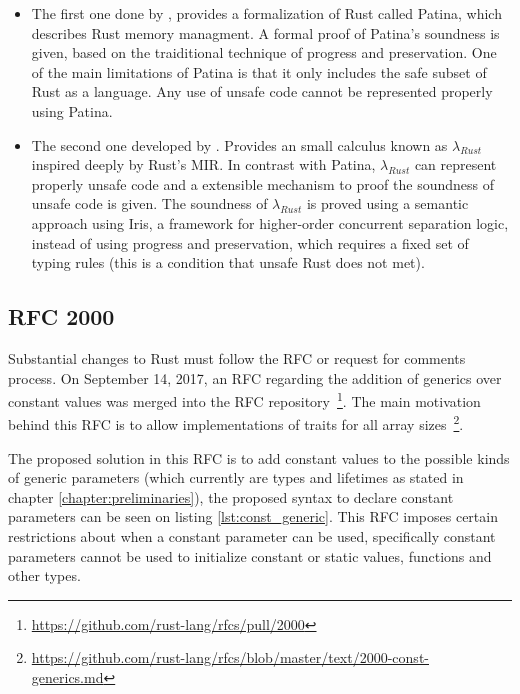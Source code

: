 \begin{itemize} 
    
    \item The first one done by \citet{reed}, provides a formalization of Rust
        called Patina, which describes Rust memory managment. A formal proof of
        Patina's soundness is given, based on the traiditional technique of
        progress and preservation. One of the main limitations of Patina is that
        it only includes the safe subset of Rust as a language. Any use of
        unsafe code cannot be represented properly using Patina.

    \item The second one developed by \citet{ralf}. Provides an small calculus
        known as $\lambda_{Rust}$ inspired deeply by Rust's MIR. In contrast
        with Patina, $\lambda_{Rust}$ can represent properly unsafe code and a
        extensible mechanism to proof the soundness of unsafe code is given. The
        soundness of $\lambda_{Rust}$ is proved using a semantic approach using
        Iris, a framework for higher-order concurrent separation logic, instead
        of using progress and preservation, which requires a fixed set of typing
        rules (this is a condition that unsafe Rust does not met).
        
\end{itemize}

\subsection{RFC 2000} 

Substantial changes to Rust must follow the RFC or request for comments process.
On September 14, 2017, an RFC regarding the addition of generics over constant
values was merged into the RFC
repository~\footnote{\url{https://github.com/rust-lang/rfcs/pull/2000}}. The
main motivation behind this RFC is to allow implementations of traits for all
array sizes~\footnote{\url{https://github.com/rust-lang/rfcs/blob/master/text/2000-const-generics.md}}. 

The proposed solution in this RFC is to add constant values to the possible
kinds of generic parameters (which currently are types and lifetimes as stated
in chapter \ref{chapter:preliminaries}), the proposed syntax to declare constant
parameters can be seen on listing \ref{lst:const_generic}. This RFC imposes
certain restrictions about when a constant parameter can be used, specifically
constant parameters cannot be used to initialize constant or static values,
functions and other types.

